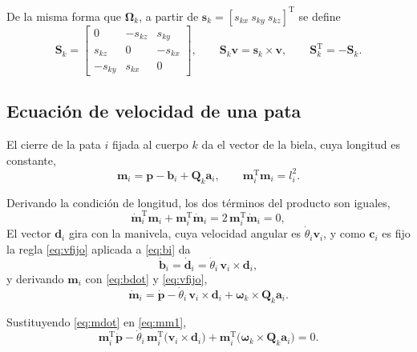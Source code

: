 \documentclass[11pt]{article}
\newcommand{\T}{^{\mathrm{T}}}
\newcommand{\pvec}{\mathbf{p}}
\newcommand{\wv}{\boldsymbol{\omega}}
\newcommand{\Om}{\boldsymbol{\Omega}}
\begin{document}
De la misma forma que $\Om_k$, a partir de $\mathbf{s}_k=[s_{kx}\ s_{ky}\ s_{kz}]\T$ se define
\begin{equation}
\mathbf{S}_k=
\begin{bmatrix}
0 & -s_{kz} & s_{ky}\\
s_{kz} & 0 & -s_{kx}\\
-s_{ky} & s_{kx} & 0
\end{bmatrix},
\qquad
\mathbf{S}_k\mathbf{v}=\mathbf{s}_k\times\mathbf{v},
\qquad
\mathbf{S}_k\T=-\mathbf{S}_k .
\label{eq:Sk}
\end{equation}

\subsection{Ecuación de velocidad de una pata}

El cierre de la pata $i$ fijada al cuerpo $k$ da el vector de la biela, cuya longitud es constante,
\begin{equation}
\mathbf{m}_i=\pvec-\mathbf{b}_i+\mathbf{Q}_k\mathbf{a}_i ,
\qquad
\mathbf{m}_i\T\mathbf{m}_i=l_i^2 .
\label{eq:mi}
\end{equation}

Derivando la condición de longitud, los dos términos del producto son iguales,
\begin{equation}
\dot{\mathbf{m}}_i\T\mathbf{m}_i+\mathbf{m}_i\T\dot{\mathbf{m}}_i=2\,\mathbf{m}_i\T\dot{\mathbf{m}}_i=0 ,
\label{eq:mm1}
\end{equation}
El vector $\mathbf{d}_i$ gira con la manivela, cuya velocidad angular es $\dot\theta_i\mathbf{v}_i$, y como $\mathbf{c}_i$ es fijo la regla \eqref{eq:vfijo} aplicada a \eqref{eq:bi} da
\begin{equation}
\dot{\mathbf{b}}_i=\dot{\mathbf{d}}_i=\dot\theta_i\,\mathbf{v}_i\times\mathbf{d}_i ,
\label{eq:bdot}
\end{equation}
y derivando $\mathbf{m}_i$ con \eqref{eq:bdot} y \eqref{eq:vfijo},
\begin{equation}
\dot{\mathbf{m}}_i=\dot{\pvec}-\dot\theta_i\,\mathbf{v}_i\times\mathbf{d}_i+\wv_k\times\mathbf{Q}_k\mathbf{a}_i .
\label{eq:mdot}
\end{equation}

Sustituyendo \eqref{eq:mdot} en \eqref{eq:mm1},
\begin{equation}
\mathbf{m}_i\T\dot{\pvec}-\dot\theta_i\,\mathbf{m}_i\T\big(\mathbf{v}_i\times\mathbf{d}_i\big)+\mathbf{m}_i\T\big(\wv_k\times\mathbf{Q}_k\mathbf{a}_i\big)=0 .
\label{eq:paso1}
\end{equation}
\end{document}
